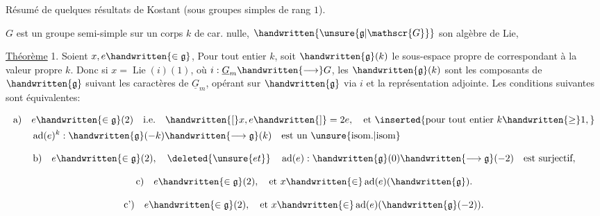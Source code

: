 Résumé de quelques résultats de Kostant (sous groupes simples de rang $1$).

$G$ est un groupe semi-simple sur un corps $k$ de car. nulle, $\handwritten{\unsure{\mathfrak{g}|\mathscr{G}}}$ son algèbre de Lie,

\uline{Théorème} 1.  Soient $x,e\handwritten{\in\mathfrak{g}}$, Pour tout entier $k$, soit $\handwritten{\mathfrak{g}}(k)$ le sous-espace propre de\hspace{1.5em} correspondant à la valeur propre $k$. Donc si $x=\operatorname{Lie}(i)(1)$, où $i:\underline{G}_m\handwritten{\longrightarrow}G$, les $\handwritten{\mathfrak{g}}(k)$ sont les  composants de $\handwritten{\mathfrak{g}}$ suivant les caractères de $\underline{G}_m$, opérant sur $\handwritten{\mathfrak{g}}$ via $i$ et la représentation adjointe. Les conditions suivantes sont équivalentes:

\[
\begin{aligned}
\text{a)}\quad &e\handwritten{\in\mathfrak{g}}(2)\quad\text{i.e.}\quad \handwritten{[}x,e\handwritten{]}=2e,\quad\text{et }\inserted{\text{pour tout entier }k\handwritten{\geq}1,}\\
&\operatorname{ad}(e)^k:\handwritten{\mathfrak{g}}(-k)\handwritten{\longrightarrow\mathfrak{g}}(k)\quad\text{est un }\unsure{\text{isom.}|\text{isom}}
\end{aligned}
\]

\[
\text{b)}\quad e\handwritten{\in\mathfrak{g}}(2),\quad\deleted{\unsure{et}}\quad \operatorname{ad}(e):\handwritten{\mathfrak{g}}(0)\handwritten{\longrightarrow\mathfrak{g}}(-2)\quad\text{est surjectif},
\]


\[
\text{c)}\quad e\handwritten{\in\mathfrak{g}}(2),\quad\text{et }x\handwritten{\in}\operatorname{ad}(e)(\handwritten{\mathfrak{g}}).
\]

\[
\text{c')}\quad e\handwritten{\in\mathfrak{g}}(2),\quad\text{et }x\handwritten{\in}\operatorname{ad}(e)(\handwritten{\mathfrak{g}}(-2)).
\]

